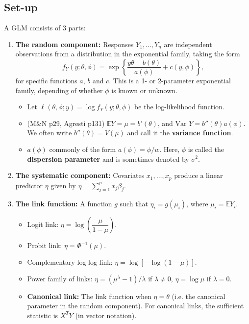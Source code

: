 \documentclass[twoside]{article}
\newcommand\dis{\displaystyle}
\newcommand\bbE{\mathbb{E}}
\newcommand\lmb{\lambda}
\newcommand\sg{\sigma}
\def\t{\theta}
\newcommand\var{\text{Var }}
\begin{document}
\subsection{Set-up}
A GLM consists of 3 parts:
\begin{enumerate}
\item \textbf{The random component:} Responses $Y_1, \dots, Y_n$ are independent observations from a distribution in the exponential family, taking the form
\[ f_Y(y; \t, \phi) = \exp \left\{ \frac{y\t - b(\t)}{a(\phi)} + c(y, \phi) \right\}, \]
for specific functions $a$, $b$ and $c$. This is a 1- or 2-parameter exponential family, depending of whether $\phi$ is known or unknown.
\begin{itemize}
\item Let $\ell(\t, \phi; y) = \log f_Y(y; \t, \phi)$ be the log-likelihood function.

\item (M\&N p29, Agresti p131) $\bbE Y = \mu = b'(\t)$, and $\var Y = b''(\t) a(\phi)$. We often write $b''(\t) = V(\mu)$ and call it the \textbf{variance function}.

\item $a(\phi)$ commonly of the form $a(\phi) = \phi/w$. Here, $\phi$ is called the \textbf{dispersion parameter} and is sometimes denoted by $\sg^2$.
\end{itemize}

\item \textbf{The systematic component:} Covariates $x_1, \dots, x_p$ produce a linear predictor $\eta$ given by $\eta = \dis\sum_{j=1}^p x_j \beta_j$.

\item \textbf{The link function:} A function $g$ such that $\eta_i = g(\mu_i)$, where $\mu_i = \bbE Y_i$.
\begin{itemize}
\item Logit link: $\eta = \log \left( \dfrac{\mu}{1 - \mu}\right)$.
\item Probit link: $\eta = \Phi^{-1}(\mu)$.
\item Complementary log-log link: $\eta = \log[-\log(1-\mu)]$.
\item Power family of links: $\eta = (\mu^\lmb - 1)/ \lmb$ if $\lmb \neq 0$, $\eta = \log \mu$ if $\lmb = 0$.
\item \textbf{Canonical link:} The link function when $\eta = \t$ (i.e. the canonical parameter in the random component). For canonical links, the sufficient statistic is $X^T Y$ (in vector notation).
\end{itemize}

\end{enumerate}
\end{document}
